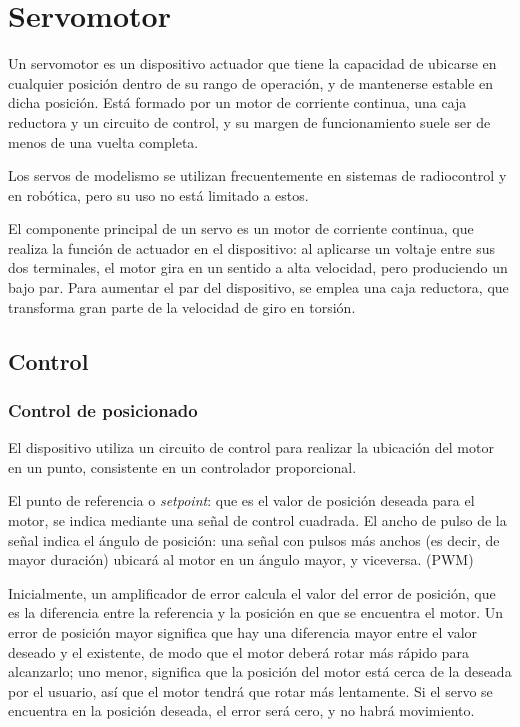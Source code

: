 \documentclass[../main]{subfiles}
\begin{document}
\chapter{Servomotor}
Un servomotor es un dispositivo actuador que tiene la capacidad de ubicarse en cualquier posici\'on{} dentro de su rango de operaci\'on{}, y de mantenerse estable en dicha posici\'on{}. Est\'a{} formado por un motor de corriente continua, una caja reductora y un circuito de control, y su margen de funcionamiento suele ser de menos de una vuelta completa.

Los servos de modelismo se utilizan frecuentemente en sistemas de radiocontrol y en rob\'otica{}, pero su uso no est\'a{} limitado a estos.

El componente principal de un servo es un motor de corriente continua, que realiza la funci\'on{} de actuador en el dispositivo: al aplicarse un voltaje entre sus dos terminales, el motor gira en un sentido a alta velocidad, pero produciendo un bajo par. Para aumentar el par del dispositivo, se emplea una caja reductora, que transforma gran parte de la velocidad de giro en torsi\'on{}.


\section{Control}
\subsection{Control de posicionado}


El dispositivo utiliza un circuito de control para realizar la ubicaci\'on{} del motor en un punto, consistente en un controlador proporcional.

El punto de referencia o \emph{setpoint}: que es el valor de posici\'on{} deseada para el motor, se indica mediante una se\~nal{} de control cuadrada. El ancho de pulso de la se\~nal{} indica el \'angulo{} de posici\'on{}: una se\~nal{} con pulsos m\'as{} anchos (es decir, de mayor duraci\'on{}) ubicar\'a{} al motor en un \'angulo{} mayor, y viceversa. (PWM)

Inicialmente, un amplificador de error calcula el valor del error de posici\'on{}, que es la diferencia entre la referencia y la posici\'on{} en que se encuentra el motor. Un error de posici\'on{} mayor significa que hay una diferencia mayor entre el valor deseado y el existente, de modo que el motor deber\'a{} rotar m\'as{} r\'apido{} para alcanzarlo; uno menor, significa que la posici\'on{} del motor est\'a{} cerca de la deseada por el usuario, as\'i{} que el motor tendr\'a{} que rotar m\'as{} lentamente. Si el servo se encuentra en la posici\'on{} deseada, el error ser\'a{} cero, y no habr\'a{} movimiento.
\end{document}
